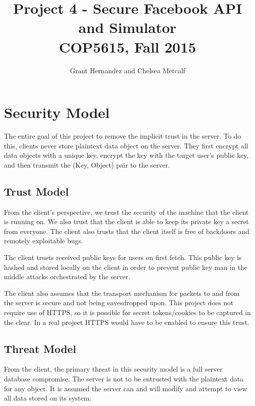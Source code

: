 \documentclass{article}
\begin{document}
\title{Project 4 - Secure Facebook API and Simulator \\ COP5615, Fall 2015}
 
\author{Grant Hernandez and Chelsea Metcalf}
 
\maketitle %

\section*{Security Model}

The entire goal of this project to remove the implicit trust in the server. To do this, clients never store plaintext data object on the server. They first encrypt all data objects with a unique key, encrypt the key with the target user's public key, and then transmit the (Key, Object) pair to the server.

\subsection*{Trust Model}
From the client's perspective, we trust the security of the machine that the client is running on. We also trust that the client is able to keep its private key a secret from everyone. The client also trusts that the client itself is free of backdoors and remotely exploitable bugs.

The client trusts received public keys for users on first fetch. This public key is hashed and stored locally on the client in order to prevent public key man in the middle attacks orchestrated by the server.

The client also assumes that the transport mechanism for packets to and from the server is secure and not being eavesdropped upon. This project does not require use of HTTPS, so it is possible for secret tokens/cookies to be captured in the clear. In a real project HTTPS would have to be enabled to ensure this trust.

\subsection*{Threat Model}
From the client, the primary threat in this security model is a full server database compromise. The server is not to be entrusted with the plaintext data for any object. It is assumed the server can and will modify and attempt to view all data stored on its system.
\end{document}
